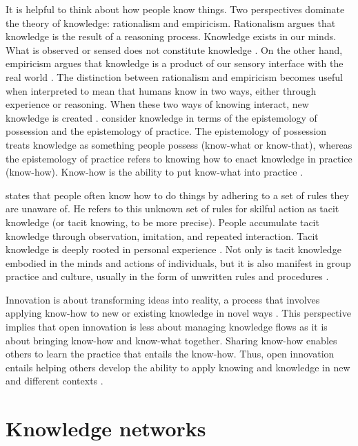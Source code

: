 It is helpful to think about how people know things. Two perspectives dominate the theory of knowledge: rationalism and empiricism. Rationalism argues that knowledge is the result of a reasoning process. Knowledge exists in our minds. What is observed or sensed does not constitute knowledge \citep{russell2009human}. On the other hand, empiricism argues that knowledge is a product of our sensory interface with the real world \citep{bolisani2018elusive}. The distinction between rationalism and empiricism becomes useful when interpreted to mean that humans know in two ways, either through experience or reasoning. When these two ways of knowing interact, new knowledge is created \citep{spender1996making,bolisani2018elusive}. \citet{cook1999bridging} consider knowledge in terms of the epistemology of possession and the epistemology of practice. The epistemology of possession treats knowledge as something people possess (know-what or know-that), whereas the epistemology of practice refers to knowing how to enact knowledge in practice (know-how). Know-how is the ability to put know-what into practice \citep{cook1999bridging,tsoukas2001organizational, marabelli2014knowing}. \medskip

\citet{polanyi1966tacit} states that people often know how to do things by adhering to a set of rules they are unaware of. He refers to this unknown set of rules for skilful action as tacit knowledge (or tacit knowing, to be more precise). People accumulate tacit knowledge through observation, imitation, and repeated interaction. Tacit knowledge is deeply rooted in personal experience \citep{nonaka1995knowledge}. Not only is tacit knowledge embodied in the minds and actions of individuals, but it is also manifest in group practice and culture, usually in the form of unwritten rules and procedures \citep{munoz2015tacit}. \medskip

Innovation is about transforming ideas into reality, a process that involves applying know-how to new or existing knowledge in novel ways \citep{van1986central,quintane2011innovation,garud2013perspectives}. This perspective implies that open innovation is less about managing knowledge flows as it is about bringing know-how and know-what together. Sharing know-how enables others to learn the practice that entails the know-how. Thus, open innovation entails helping others develop the ability to apply knowing and knowledge in new and different contexts \citep{van1986central}. 

\section{Knowledge networks}

